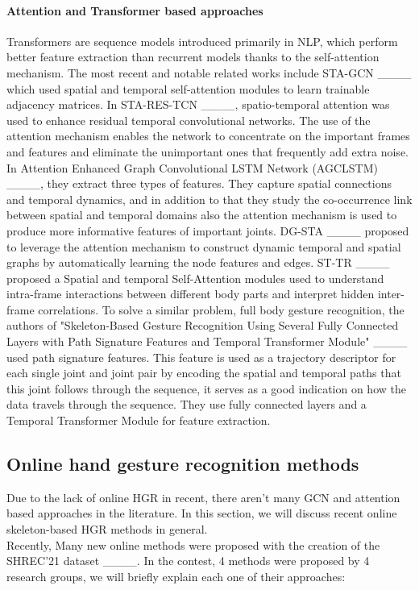 \paragraph{Attention and Transformer based approaches}
Transformers are sequence models introduced primarily in NLP, which perform better feature extraction than recurrent models thanks to the self-attention mechanism. The most recent and notable related works include STA-GCN ____ which used spatial and temporal self-attention modules to learn trainable adjacency matrices. In STA-RES-TCN ____, spatio-temporal attention was used to enhance residual temporal convolutional networks. The use of the attention mechanism enables the network to concentrate on the important frames and features and eliminate the unimportant ones that frequently add extra noise. In Attention Enhanced Graph Convolutional LSTM Network (AGCLSTM) ____, they extract three types of features. They capture spatial connections and temporal dynamics, and in addition to that they study the co-occurrence link between spatial and temporal domains also the attention mechanism is used to produce more informative features of important joints. DG-STA ____ proposed to leverage the attention mechanism to construct dynamic temporal and spatial graphs by automatically learning the node features and edges. ST-TR ____ proposed a Spatial and temporal Self-Attention modules used to understand intra-frame interactions between different body parts and interpret hidden inter-frame correlations. To solve a similar problem, full body gesture recognition, the authors of "Skeleton-Based Gesture Recognition Using Several Fully Connected Layers with Path Signature Features and Temporal Transformer Module"  ____ used path signature features. This feature is used as a trajectory descriptor for each single joint and joint pair by encoding the spatial and temporal paths that this joint follows through the sequence, it serves as a good indication on how the data travels through the sequence. They use fully connected layers and a Temporal Transformer Module for feature extraction. \\



\subsection{Online hand gesture recognition methods}
Due to the lack of online HGR in recent, there aren't many GCN and attention based approaches in the literature. In this section, we will discuss recent online skeleton-based HGR methods in general. \\
Recently, Many new online methods were proposed with the creation of the SHREC'21 dataset ____. In the contest, 4 methods were proposed by 4 research groups, we will briefly explain each one of their approaches: \\

